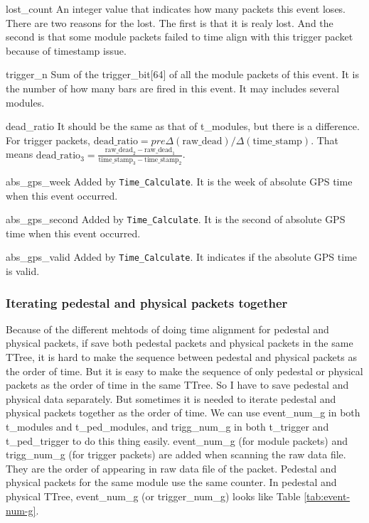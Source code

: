 \documentclass[a4paper, 12pt, onecolumn]{article}
\begin{document}
\begin{asparadesc}
\item[lost\_count] An integer value that indicates how many packets this event loses. There are two reasons for the lost.
  The first is that it is realy lost. And the second is that some module packets failed to time align with this trigger packet because of timestamp issue.
\item[trigger\_n] Sum of the trigger\_bit[64] of all the module packets of this event. It is the number of how many bars are fired in this event. It may includes several modules.
\item[dead\_ratio] It should be the same as that of t\_modules, but there is a difference. For trigger packets,
  $\textrm{dead\_ratio} = pre\Delta(\textrm{raw\_dead}) / \Delta(\textrm{time\_stamp})$.
  That means $\textrm{dead\_ratio}_3 = \frac{\textrm{raw\_dead}_2 - \textrm{raw\_dead}_1}{\textrm{time\_stamp}_3 - \textrm{time\_stamp}_2}$.
\item[abs\_gps\_week] Added by \texttt{Time\_Calculate}. It is the week of absolute GPS time when this event occurred.
\item[abs\_gps\_second] Added by \texttt{Time\_Calculate}. It is the second of absolute GPS time when this event occurred.
\item[abs\_gps\_valid] Added by \texttt{Time\_Calculate}. It indicates if the absolute GPS time is valid.
\end{asparadesc}

\subsubsection{Iterating pedestal and physical packets together}
Because of the different mehtods of doing time alignment for pedestal and physical packets, if save both pedestal packets and physical packets in the same TTree,
it is hard to make the sequence between pedestal and physical packets as the order of time.
But it is easy to make the sequence of only pedestal or physical packets as the order of time in the same TTree.
So I have to save pedestal and physical data separately.
But sometimes it is needed to iterate pedestal and physical packets together as the order of time.
We can use event\_num\_g in both t\_modules and t\_ped\_modules, and trigg\_num\_g in both t\_trigger and t\_ped\_trigger to do this thing easily.
event\_num\_g (for module packets) and trigg\_num\_g (for trigger packets) are added when scanning the raw data file.
They are the order of appearing in raw data file of the packet. Pedestal and physical packets for the same module use the same counter.
In pedestal and physical TTree, event\_num\_g (or trigger\_num\_g) looks like Table \ref{tab:event-num-g}.
\end{document}
